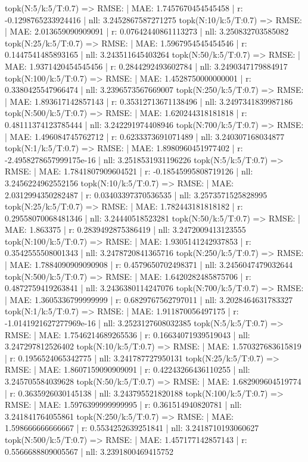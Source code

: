 topk(N:5/k:5/T:0.7) => RMSE: | MAE: 1.7457670454545458 | r: -0.1298765233924416 | nll: 3.2452867587271275
topk(N:10/k:5/T:0.7) => RMSE: | MAE: 2.013659090909091 | r: 0.07642440861113273 | nll: 3.250832703585082
topk(N:25/k:5/T:0.7) => RMSE: | MAE: 1.5967954545454546 | r: 0.1447541485893165 | nll: 3.243511645403264
topk(N:50/k:5/T:0.7) => RMSE: | MAE: 1.9371420454545456 | r: 0.2844292493602784 | nll: 3.2490347179884917
topk(N:100/k:5/T:0.7) => RMSE: | MAE: 1.4528750000000001 | r: 0.3380425547966474 | nll: 3.2396573567669007
topk(N:250/k:5/T:0.7) => RMSE: | MAE: 1.893617142857143 | r: 0.35312713671138496 | nll: 3.2497341839987186
topk(N:500/k:5/T:0.7) => RMSE: | MAE: 1.620244318181818 | r: 0.48111374123785444 | nll: 3.242291974408946
topk(N:700/k:5/T:0.7) => RMSE: | MAE: 1.496084745762712 | r: 0.6233373691071489 | nll: 3.240307168034877
topk(N:1/k:5/T:0.7) => RMSE: | MAE: 1.8980960451977402 | r: -2.4958278657999175e-16 | nll: 3.2518531931196226
topk(N:5/k:5/T:0.7) => RMSE: | MAE: 1.7841807909604521 | r: -0.18545995808719126 | nll: 3.2456224962552156
topk(N:10/k:5/T:0.7) => RMSE: | MAE: 2.0312994350282487 | r: 0.03403397370536535 | nll: 3.2573571525828995
topk(N:25/k:5/T:0.7) => RMSE: | MAE: 1.782443181818182 | r: 0.29558070068481346 | nll: 3.24440518523281
topk(N:50/k:5/T:0.7) => RMSE: | MAE: 1.863375 | r: 0.2839492875386419 | nll: 3.2472009413123555
topk(N:100/k:5/T:0.7) => RMSE: | MAE: 1.9305141242937853 | r: 0.3542555508001343 | nll: 3.2478720841365716
topk(N:250/k:5/T:0.7) => RMSE: | MAE: 1.7884090909090908 | r: 0.4579650702498371 | nll: 3.2456047479032644
topk(N:500/k:5/T:0.7) => RMSE: | MAE: 1.6420282485875706 | r: 0.4872759419263841 | nll: 3.2436380114247076
topk(N:700/k:5/T:0.7) => RMSE: | MAE: 1.3605336799999999 | r: 0.6829767562797011 | nll: 3.2028464631783327
topk(N:1/k:5/T:0.7) => RMSE: | MAE: 1.911870056497175 | r: -1.0141921627277969e-16 | nll: 3.2523127608032385
topk(N:5/k:5/T:0.7) => RMSE: | MAE: 1.7546214689265536 | r: 0.16634071939519043 | nll: 3.247297812526402
topk(N:10/k:5/T:0.7) => RMSE: | MAE: 1.570327683615819 | r: 0.1956524065342775 | nll: 3.241787727950131
topk(N:25/k:5/T:0.7) => RMSE: | MAE: 1.8607159090909091 | r: 0.42243266436110255 | nll: 3.245705584039628
topk(N:50/k:5/T:0.7) => RMSE: | MAE: 1.682909604519774 | r: 0.3635926030145138 | nll: 3.243795521820188
topk(N:100/k:5/T:0.7) => RMSE: | MAE: 1.5976399999999995 | r: 0.361514940820781 | nll: 3.241841764055861
topk(N:250/k:5/T:0.7) => RMSE: | MAE: 1.598666666666667 | r: 0.5534252639251841 | nll: 3.2418710193060627
topk(N:500/k:5/T:0.7) => RMSE: | MAE: 1.457177142857143 | r: 0.5566688809005567 | nll: 3.2391800469415752
